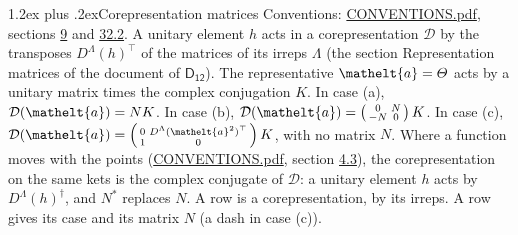 \documentclass[10pt,a4paper]{article}
\makeatletter
\renewcommand\section{\@startsection{section}{1}{\z@}{-3ex plus -1ex minus -.2ex}%
  {1.2ex plus .2ex}{\normalfont\large\sffamily\bfseries\color{parttitle}}}
\numberwithin{equation}{section}
\newcommand{\eltfont}[1]{{\let\sigma\eltsigma\mathelt{#1}}}
\newcommand{\grp}[1]{\mathsf{#1}}
\newcommand{\elt}[1]{\eltfont{#1}}
\makeatother
\begin{document}
\section{Corepresentation matrices}\label{s:corep_matrices}
Conventions: \href{../../CONVENTIONS.pdf}{CONVENTIONS.pdf}, sections \href{../../../rotation/CONVENTIONS.pdf\#conv.9}{9} and \href{../../CONVENTIONS.pdf\#conv.32.2}{32.2}.
A unitary element $h$ acts in a corepresentation $\mathcal{D}$ by the transposes $D^{\Lambda}(h)^{\top}$ of the matrices of its irreps $\Lambda$ (the section Representation matrices of the document of \href{../../../rotation/data/pdf/D12.pdf}{$\grp{D_{12}}$}). The representative $\elt{a} = \varTheta$ acts by a unitary matrix times the complex conjugation $K$.
In case (a), $\mathcal{D}(\elt{a}) = NK$. In case (b), $\mathcal{D}(\elt{a}) = \left(\begin{smallmatrix} 0 & N \\ -N & 0 \end{smallmatrix}\right) K$. In case (c), $\mathcal{D}(\elt{a}) = \left(\begin{smallmatrix} 0 & D^{\Lambda}(\elt{a}^2)^{\top} \\ 1 & 0 \end{smallmatrix}\right) K$, with no matrix $N$.
Where a function moves with the points (\href{../../CONVENTIONS.pdf}{CONVENTIONS.pdf}, section \href{../../../rotation/CONVENTIONS.pdf\#conv.4.3}{4.3}), the corepresentation on the same kets is the complex conjugate of $\mathcal{D}$: a unitary element $h$ acts by $D^{\Lambda}(h)^{\dagger}$, and $N^{*}$ replaces $N$.
A row is a corepresentation, by its irreps. A row gives its case and its matrix $N$ (a dash in case (c)).
\end{document}
